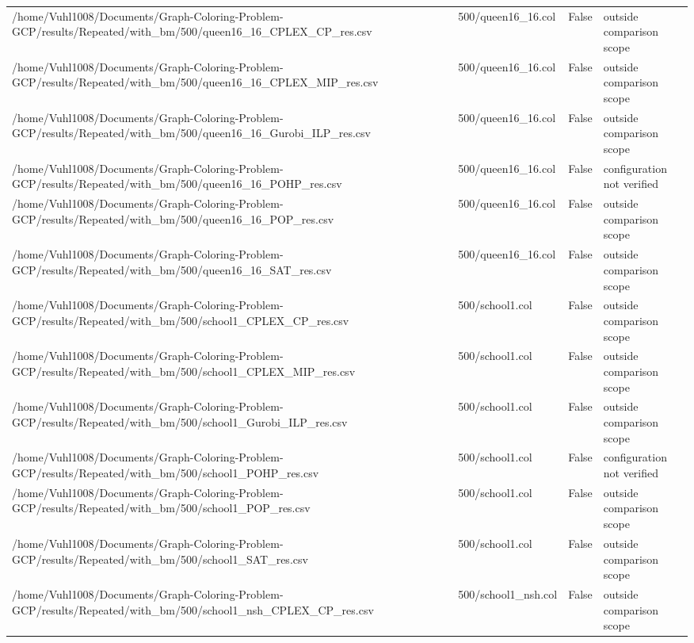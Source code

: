 \begin{table}[htbp]
\begin{tabular}{llll}
/home/Vuhl1008/Documents/Graph-Coloring-Problem-GCP/results/Repeated/with\_bm/500/queen16\_16\_CPLEX\_CP\_res.csv & 500/queen16\_16.col & False & outside comparison scope \\
/home/Vuhl1008/Documents/Graph-Coloring-Problem-GCP/results/Repeated/with\_bm/500/queen16\_16\_CPLEX\_MIP\_res.csv & 500/queen16\_16.col & False & outside comparison scope \\
/home/Vuhl1008/Documents/Graph-Coloring-Problem-GCP/results/Repeated/with\_bm/500/queen16\_16\_Gurobi\_ILP\_res.csv & 500/queen16\_16.col & False & outside comparison scope \\
/home/Vuhl1008/Documents/Graph-Coloring-Problem-GCP/results/Repeated/with\_bm/500/queen16\_16\_POHP\_res.csv & 500/queen16\_16.col & False & configuration not verified \\
/home/Vuhl1008/Documents/Graph-Coloring-Problem-GCP/results/Repeated/with\_bm/500/queen16\_16\_POP\_res.csv & 500/queen16\_16.col & False & outside comparison scope \\
/home/Vuhl1008/Documents/Graph-Coloring-Problem-GCP/results/Repeated/with\_bm/500/queen16\_16\_SAT\_res.csv & 500/queen16\_16.col & False & outside comparison scope \\
/home/Vuhl1008/Documents/Graph-Coloring-Problem-GCP/results/Repeated/with\_bm/500/school1\_CPLEX\_CP\_res.csv & 500/school1.col & False & outside comparison scope \\
/home/Vuhl1008/Documents/Graph-Coloring-Problem-GCP/results/Repeated/with\_bm/500/school1\_CPLEX\_MIP\_res.csv & 500/school1.col & False & outside comparison scope \\
/home/Vuhl1008/Documents/Graph-Coloring-Problem-GCP/results/Repeated/with\_bm/500/school1\_Gurobi\_ILP\_res.csv & 500/school1.col & False & outside comparison scope \\
/home/Vuhl1008/Documents/Graph-Coloring-Problem-GCP/results/Repeated/with\_bm/500/school1\_POHP\_res.csv & 500/school1.col & False & configuration not verified \\
/home/Vuhl1008/Documents/Graph-Coloring-Problem-GCP/results/Repeated/with\_bm/500/school1\_POP\_res.csv & 500/school1.col & False & outside comparison scope \\
/home/Vuhl1008/Documents/Graph-Coloring-Problem-GCP/results/Repeated/with\_bm/500/school1\_SAT\_res.csv & 500/school1.col & False & outside comparison scope \\
/home/Vuhl1008/Documents/Graph-Coloring-Problem-GCP/results/Repeated/with\_bm/500/school1\_nsh\_CPLEX\_CP\_res.csv & 500/school1\_nsh.col & False & outside comparison scope \\

\end{tabular}
\end{table}
